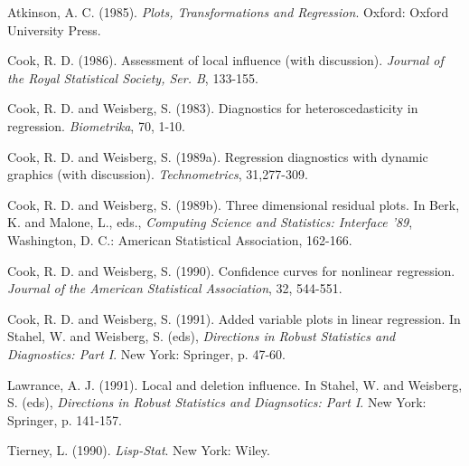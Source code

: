 \begin{references}{}
\item Atkinson, A. C. (1985).  {\sl Plots, Transformations and Regression}.
Oxford:  Oxford University Press.
\item Cook, R. D. (1986).  Assessment of local influence (with discussion).  
{\sl Journal of the Royal Statistical Society, Ser. B},  133-155.
\item Cook, R. D. and Weisberg, S. (1983). Diagnostics for heteroscedasticity
in regression.  {\sl Biometrika}, 70, 1-10.
\item Cook, R. D. and Weisberg, S. (1989a). Regression diagnostics with dynamic
graphics (with discussion).  {\sl Technometrics}, 31,277-309.
\item Cook, R. D. and Weisberg, S. (1989b). Three dimensional residual plots.
In Berk, K. and Malone, L., eds., {\sl Computing Science and Statistics:
Interface '89}, Washington, D. C.:  American Statistical Association,
162-166. 
\item Cook, R. D. and Weisberg, S. (1990).  Confidence curves for nonlinear
regression.  {\sl Journal of the American Statistical Association}, 32, 544-551.
\item Cook, R. D. and Weisberg, S. (1991).  Added variable plots in linear
regression.  In Stahel, W. and Weisberg, S. (eds), {\sl Directions in
Robust Statistics and Diagnostics:  Part I}.  New York:  Springer, p. 47-60.
\item Lawrance, A. J. (1991).  Local and deletion influence.   In Stahel, W.
and Weisberg, S. (eds), {\sl Directions in
Robust Statistics and Diagnsotics:  Part I}.  New York:  Springer, p.
141-157.
\item Tierney, L. (1990).  {\sl Lisp-Stat}.  New York:  Wiley.
\end{references}

